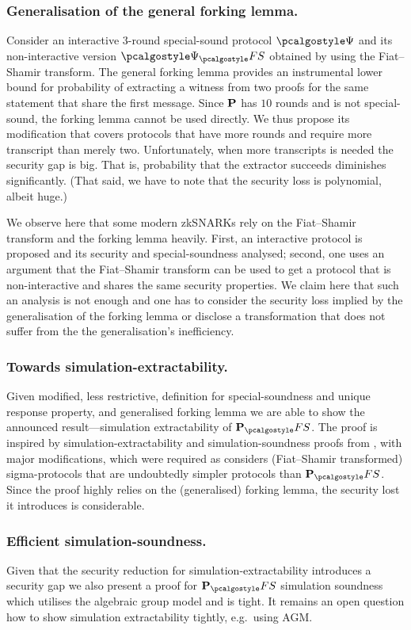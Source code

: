 \documentclass[runningheads,11pt]{llncs}
\theoremstyle{definition}
\begin{document}
\subsubsection{Generalisation of the general forking lemma.}
Consider an interactive $3$-round special-sound protocol $\ps$ and its non-interactive version $\ps_\fs$ obtained by using the Fiat--Shamir transform. The general forking lemma provides an instrumental lower bound for probability of extracting a witness from two proofs for the same statement that share the first message.
Since $\mathbf{P}$ has $10$ rounds and is not special-sound, the forking lemma cannot be used directly. We thus propose its modification that covers protocols that have more rounds and require more transcript than merely two. 
Unfortunately, when more transcripts is needed the security gap is big. That is, probability that the extractor succeeds diminishes significantly. (That said, we have to note that the security loss is polynomial, albeit huge.)

We observe here that some modern zkSNARKs rely on the Fiat--Shamir transform and
the forking lemma heavily. First, an interactive protocol is proposed and its
security and special-soundness analysed; second, one uses an argument that the
Fiat--Shamir transform can be used to get a protocol that is non-interactive and
shares the same security properties.  We claim here that such an analysis is not
enough and one has to consider the security loss implied by the generalisation
of the forking lemma or disclose a transformation that does not suffer from the
the generalisation's inefficiency.

\subsubsection{Towards simulation-extractability.} Given modified, less
restrictive, definition for special-soundness and unique response property, and
generalised forking lemma we are able to show the announced result---simulation
extractability of $\plonkprot_\fs$. The proof is inspired by simulation-extractability and simulation-soundness proofs from \cite{INDOCRYPT:FKMV12}, with major modifications, which were required as \cite{INDOCRYPT:FKMV12} considers (Fiat--Shamir transformed) sigma-protocols that are undoubtedly simpler protocols than $\plonkprot_\fs$.
Since the proof highly relies on the (generalised) forking lemma, the security lost it introduces is considerable.

\subsubsection{Efficient simulation-soundness.}
Given that the security reduction for simulation-extractability introduces a security gap we also present a proof for $\plonkprot_\fs$ simulation soundness which utilises the algebraic group model and is tight. 
It remains an open question how to show simulation extractability tightly, e.g.~using AGM.
\end{document}

